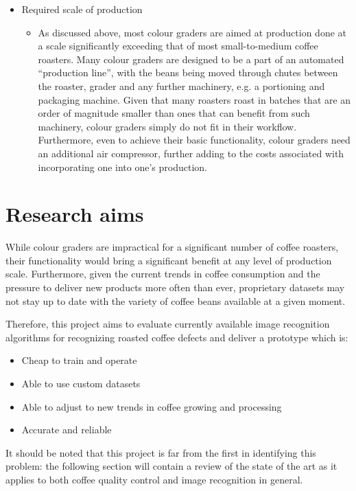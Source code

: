 \begin{itemize}
	\item Required scale of production
		\begin{itemize}
			\item As discussed above, most colour graders are aimed at production done
				at a scale significantly exceeding that of most small-to-medium coffee
				roasters.
				Many colour graders are designed to be a part of an automated ``production
				line'', with the beans being moved through chutes between the roaster, grader
				and any further machinery, e.g. a portioning and packaging machine.
				Given that many roasters roast in batches that are an order of magnitude
				smaller than ones that can benefit from such machinery, colour graders simply
				do not fit in their workflow.
				Furthermore, even to achieve their basic functionality,
				colour graders need an additional air compressor, further adding to the costs
				associated with incorporating one into one's production.
		\end{itemize}
\end{itemize}

\section{Research aims}
\label{sec:research-aims}
While colour graders are impractical for a significant
number of coffee roasters, their functionality would bring a significant benefit
at any level of production scale.
Furthermore, given the current trends in coffee
consumption and the pressure to deliver new products more often than ever,
proprietary datasets may not stay up to date with the variety of coffee beans available at
a given moment.

Therefore, this project aims to evaluate currently available image recognition algorithms
for recognizing roasted coffee defects and deliver a prototype which is:
\begin{itemize}
	\item Cheap to train and operate

	\item Able to use custom datasets

	\item Able to adjust to new trends in coffee growing and processing

	\item Accurate and reliable
\end{itemize}

It should be noted that this project is far from the first in identifying this problem:
the following section will contain a review of the state of the art as it applies to both
coffee quality control and image recognition in general.

